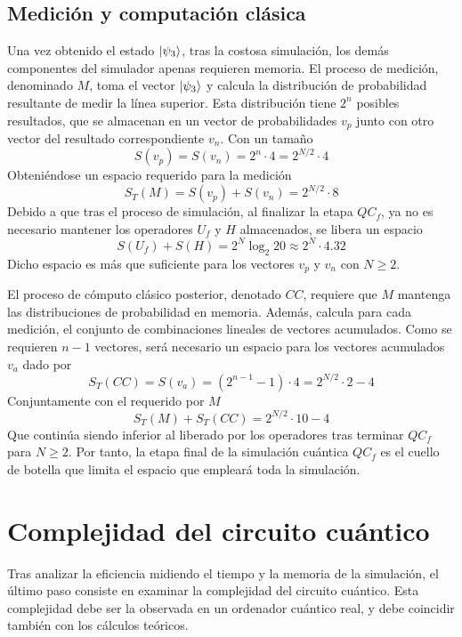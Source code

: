\subsection{Medición y computación clásica}
Una vez obtenido el estado $\ket{\psi_{3}}$, tras la costosa simulación, los demás 
componentes del simulador apenas requieren memoria.
El proceso de medición, denominado $M$, toma el vector $\ket{\psi_{3}}$ y calcula la 
distribución de probabilidad resultante de medir la línea superior. Esta 
distribución tiene $2^n$ posibles resultados, que se almacenan en un vector de 
probabilidades $v_p$ junto con otro vector del resultado correspondiente $v_n$.  
Con un tamaño
$$ S(v_p) = S(v_n) = 2^{n} \cdot 4 = 2^{N/2} \cdot 4 $$
Obteniéndose un espacio requerido para la medición
$$ S_T(M) = S(v_p) + S(v_n) = 2^{N/2} \cdot 8 $$
Debido a que tras el proceso de simulación, al finalizar la etapa $QC_f$, ya no 
es necesario mantener los operadores $U_f$ y $H$ almacenados, se libera un 
espacio
$$ S(U_f) + S(H) = 2^N \log_2 20 \approx 2^N \cdot 4.32$$
Dicho espacio es más que suficiente para los vectores $v_p$ y $v_n$ con $N \geq 
2$.

El proceso de cómputo clásico posterior, denotado $CC$, requiere que $M$ 
mantenga las distribuciones de probabilidad en memoria. Además, calcula para 
cada medición, el conjunto de combinaciones lineales de vectores acumulados.  
Como se requieren $n-1$ vectores, será necesario un espacio para los vectores 
acumulados $v_a$ dado por
$$ S_T(CC) = S(v_a) = (2^{n-1} - 1) \cdot 4 = 2^{N/2} \cdot 2 - 4$$
Conjuntamente con el requerido por $M$
$$ S_T(M) + S_T(CC) = 2^{N/2} \cdot 10 - 4 $$
Que continúa siendo inferior al liberado por los operadores tras terminar $QC_f$ 
para $N \geq 2$. Por tanto, la etapa final de la simulación cuántica $QC_f$ es 
el cuello de botella que limita el espacio que empleará toda la simulación.


\section{Complejidad del circuito cuántico}
Tras analizar la eficiencia midiendo el tiempo y la memoria de la simulación, el 
último paso consiste en examinar la complejidad del circuito cuántico. Esta 
complejidad debe ser la observada en un ordenador cuántico real, y debe 
coincidir también con los cálculos teóricos.

